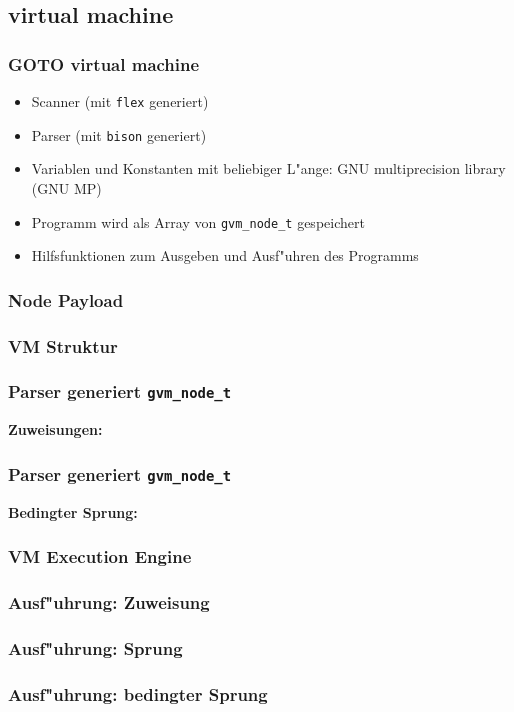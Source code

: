\documentclass{beamer}
\begin{document}
\begin{frame}
\section{virtual machine}
\frametitle{GOTO virtual machine}
\begin{itemize}
\item Scanner (mit {\tt flex} generiert)
\item Parser (mit {\tt bison} generiert)
\item Variablen und Konstanten mit beliebiger L"ange: GNU multiprecision
library (GNU MP)
\item Programm wird als Array von {\tt gvm\_node\_t} gespeichert

\item Hilfsfunktionen zum Ausgeben und Ausf"uhren des Programms
\end{itemize}
\end{frame}

\begin{frame}
\frametitle{Node Payload}

\end{frame}

\begin{frame}
\frametitle{VM Struktur}

\end{frame}

\begin{frame}
\frametitle{Parser generiert {\tt gvm\_node\_t}}
{\bf Zuweisungen:}

\end{frame}

\begin{frame}
\frametitle{Parser generiert {\tt gvm\_node\_t}}
{\bf Bedingter Sprung:}

\end{frame}

\begin{frame}
\frametitle{VM Execution Engine}

\end{frame}

\begin{frame}
\frametitle{Ausf"uhrung: Zuweisung}
{\small

}
\end{frame}

\begin{frame}
\frametitle{Ausf"uhrung: Sprung}

\end{frame}

\begin{frame}
\frametitle{Ausf"uhrung: bedingter Sprung}

\end{frame}
\end{document}
